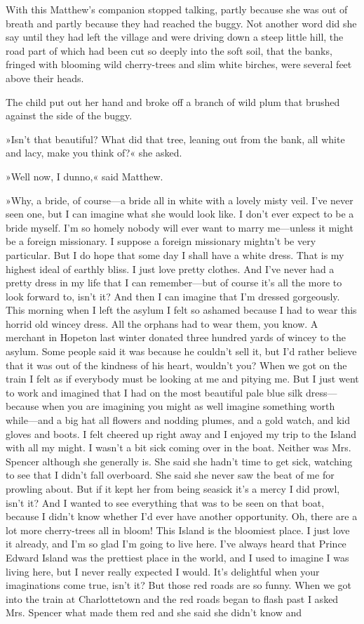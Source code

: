 With this Matthew's companion stopped talking, partly because she was out of breath and partly because they had reached the buggy. Not another word did she say until they had left the village and were driving down a steep little hill, the road part of which had been cut so deeply into the soft soil, that the banks, fringed with blooming wild cherry-trees and slim white birches, were several feet above their heads.

The child put out her hand and broke off a branch of wild plum that brushed against the side of the buggy.

»Isn't that beautiful? What did that tree, leaning out from the bank, all white and lacy, make you think of?« she asked.

»Well now, I dunno,« said Matthew.

»Why, a bride, of course—a bride all in white with a lovely misty veil. I've never seen one, but I can imagine what she would look like. I don't ever expect to be a bride myself. I'm so homely nobody will ever want to marry me—unless it might be a foreign missionary. I suppose a foreign missionary mightn't be very particular. But I do hope that some day I shall have a white dress. That is my highest ideal of earthly bliss. I just love pretty clothes. And I've never had a pretty dress in my life that I can remember—but of course it's all the more to look forward to, isn't it? And then I can imagine that I'm dressed gorgeously. This morning when I left the asylum I felt so ashamed because I had to wear this horrid old wincey dress. All the orphans had to wear them, you know. A merchant in Hopeton last winter donated three hundred yards of wincey to the asylum. Some people said it was because he couldn't sell it, but I'd rather believe that it was out of the kindness of his heart, wouldn't you? When we got on the train I felt as if everybody must be looking at me and pitying me. But I just went to work and imagined that I had on the most beautiful pale blue silk dress—because when you are imagining you might as well imagine something worth while—and a big hat all flowers and nodding plumes, and a gold watch, and kid gloves and boots. I felt cheered up right away and I enjoyed my trip to the Island with all my might. I wasn't a bit sick coming over in the boat. Neither was Mrs. Spencer although she generally is. She said she hadn't time to get sick, watching to see that I didn't fall overboard. She said she never saw the beat of me for prowling about. But if it kept her from being seasick it's a mercy I did prowl, isn't it? And I wanted to see everything that was to be seen on that boat, because I didn't know whether I'd ever have another opportunity. Oh, there are a lot more cherry-trees all in bloom! This Island is the bloomiest place. I just love it already, and I'm so glad I'm going to live here. I've always heard that Prince Edward Island was the prettiest place in the world, and I used to imagine I was living here, but I never really expected I would. It's delightful when your imaginations come true, isn't it? But those red roads are so funny. When we got into the train at Charlottetown and the red roads began to flash past I asked Mrs. Spencer what made them red and she said she didn't know and 